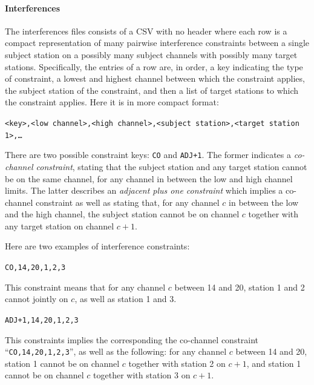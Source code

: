 \documentclass[
10pt, %
a4paper, %
oneside, %
headinclude,footinclude, %
BCOR5mm, %
]{scrartcl}
\begin{document}
\paragraph{Interferences} The interferences files consists of a CSV with no header where each row is a compact representation of many pairwise interference constraints between a single subject station on a possibly many subject channels with possibly many target stations. Specifically, the entries of a row are, in order, a key indicating the type of constraint, a lowest and highest channel between which the constraint applies, the subject station of the constraint, and then a list of target stations to which the constraint applies. Here it is in more compact format:
\begin{center}
\texttt{<key>,<low channel>,<high channel>,<subject station>,<target station 1>,\ldots}
\end{center}
There are two possible constraint keys: \texttt{CO} and \texttt{ADJ+1}. The former indicates a \emph{co-channel constraint}, stating that the subject station and any target station cannot be on the same channel, for any channel in between the low and high channel limits. The latter describes an \emph{adjacent plus one constraint} which implies a co-channel constraint as well as stating that, for any channel $c$ in between the low and the high channel, the subject station cannot be on channel $c$ together with any target station on channel $c+1$.

Here are two examples of interference constraints:
\begin{center}
\texttt{CO,14,20,1,2,3}
\end{center}
This constraint means that for any channel $c$ between 14 and 20, station 1 and 2 cannot jointly on $c$, as well as station 1 and 3.
\begin{center}
\texttt{ADJ+1,14,20,1,2,3}
\end{center}
This constraints implies the corresponding the co-channel constraint ``\texttt{CO,14,20,1,2,3}'', as well as the following: for any channel $c$ between 14 and 20, station 1 cannot be on channel $c$ together with station 2 on $c+1$, and station 1 cannot be on channel $c$ together with station 3 on $c+1$.
\end{document}

